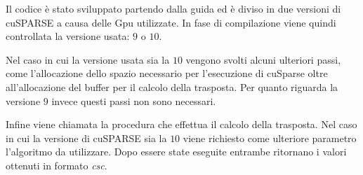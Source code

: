 Il codice è stato sviluppato partendo dalla guida \cite{cusparse} ed è diviso in due versioni di cuSPARSE a causa delle Gpu utilizzate. In fase di compilazione viene quindi controllata la versione usata: $ 9 $ o $ 10 $.

Nel caso in cui la versione usata sia la $ 10 $ vengono svolti alcuni ulteriori passi, come l'allocazione dello spazio necessario per l'esecuzione di cuSparse oltre all'allocazione del buffer per il calcolo della trasposta. Per quanto riguarda la versione $ 9 $ invece questi passi non sono necessari.

Infine viene chiamata la procedura che effettua il calcolo della trasposta. Nel caso in cui la versione di cuSPARSE sia la $ 10 $ viene richiesto come ulteriore parametro l'algoritmo da utilizzare.\newline
Dopo essere state eseguite entrambe ritornano i valori ottenuti in formato \textit{csc}.
